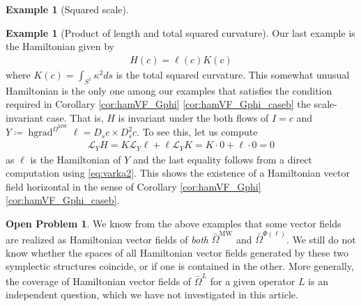 \documentclass[12pt]{amsart}
\newcommand{\rev}[1]{#1}
\theoremstyle{definition}
\newtheorem{example}[theorem]{Example}
\newtheorem{question}[theorem]{Open Problem}
\newcommand{\id}{\mathrm{id}}
\newcommand{\OmMW}{\Omega^{\operatorname{MW}}}
\def\ka{\kappa}
\def\Th{\Theta}
\def\Ph{\Phi}
\def\Om{\Omega}
\def\x{\times}
\def\L{\mathcal{L}}
\let\on=\operatorname
\begin{document}
\begin{example}[Squared scale]
\end{example}

\begin{example}[Product of length and total squared curvature]
\label{eg:length_squared_curvature}
Our last example is the Hamiltonian given by
\begin{align}
    H(c)=\rev{\ell(c)} K(c)
\end{align}
where $K(c)=\int_{S^1} \ka^2 ds$ is the total squared curvature.  This somewhat unusual Hamiltonian is the only one among our examples that satisfies the condition required in Corollary \ref{cor:hamVF_Gphi} \ref{cor:hamVF_Gphi_caseb} the scale-invariant case. That is, $H$ is invariant under the both flows of $I=c$ and $Y\coloneqq \on{hgrad}^{\OmMW}\ell=D_s c\x D_s^2 c$.
To see this, let us compute
\begin{align}
    \L_{Y}H
    =K\L_Y \ell+\ell \L_Y K
    =K\cdot 0+\ell \cdot 0 =0
\end{align}
as $\ell$ is the Hamiltonian of $Y$ and the last equality follows from a direct computation using \eqref{eq:varka2}. 
This shows the existence of a Hamiltonian vector field horizontal in the sense of Corollary \ref{cor:hamVF_Gphi} \ref{cor:hamVF_Gphi_caseb}.
\end{example}
\begin{question}
    We know from the above examples that some vector fields are realized as Hamiltonian vector fields of \emph{both} $\bar\Om^{\on{MW}}$ and $\bar\Om^{\Phi(\ell)}$. We still do not know whether the spaces of all Hamiltonian vector fields generated by these two symplectic structures coincide, or if one is contained in the other. More generally, the coverage of Hamiltonian vector fields of $\bar\Om^{L}$ for a given operator $L$ is an independent question, which we have not investigated in this article. 
\end{question}
\end{document}
